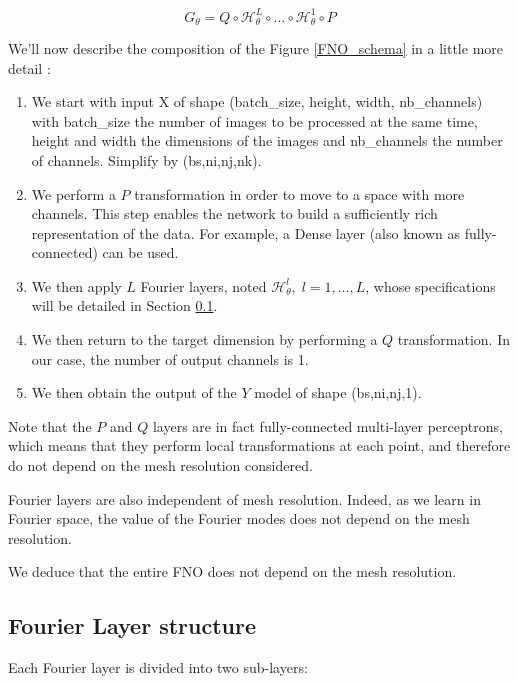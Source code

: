 \begin{equation*}
	G_\theta = Q \circ \mathcal{H}_\theta^L \circ \dots \circ \mathcal{H}_\theta^1 \circ P
\end{equation*}

We'll now describe the composition of the Figure \ref{FNO_schema} in a little more detail :
\begin{enumerate}[label=\textbullet]
	\item We start with input X of shape (batch\_size, height, width, nb\_channels) with batch\_size the number of images to be processed at the same time, height and width the dimensions of the images and nb\_channels the number of channels. Simplify by (bs,ni,nj,nk).
	\item We perform a $P$ transformation in order to move to a space with more channels. This step enables the network to build a sufficiently rich representation of the data.  For example, a Dense layer (also known as fully-connected) can be used. 	
	\item We then apply $L$ Fourier layers, noted $\mathcal{H}_\theta^l,\; l=1,\dots,L$, whose specifications will be detailed in Section \ref{FNO.fourierlayer}.
	\item We then return to the target dimension by performing a $Q$ transformation. In our case, the number of output channels is 1.
	\item We then obtain the output of the $Y$ model of shape (bs,ni,nj,1). 
\end{enumerate}

\begin{Rem}
	Note that the $P$ and $Q$ layers are in fact fully-connected multi-layer perceptrons, which means that they perform local transformations at each point, and therefore do not depend on the mesh resolution considered.
	
	Fourier layers are also independent of mesh resolution. Indeed, as we learn in Fourier space, the value of the Fourier modes does not depend on the mesh resolution.
	
	We deduce that the entire FNO does not depend on the mesh resolution.
\end{Rem}

\subsection{Fourier Layer structure} \label{FNO.fourierlayer}

Each Fourier layer is divided into two sub-layers:

